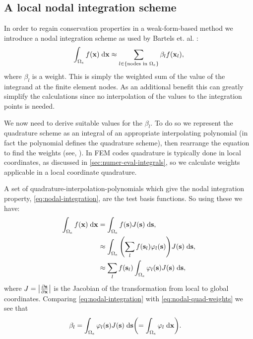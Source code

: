 {\subsection{A local nodal integration scheme}
\label{sec:local-nodal-integr}

In order to regain conservation properties in a weak-form-based method we introduce a nodal integration scheme as used by Bartels et. al. \cite{Bartels2006}:
\begin{equation}
  \label{eq:nodal-integration}
  \int_{\Omega_e} f(\boldsymbol{\mathrm{x}}) {\; \mathrm{{d}}} \boldsymbol{\mathrm{x}} \approx \sum_{l\in \left\{ {\text{nodes in $\Omega_e$}} \right\}} \beta_l f(\boldsymbol{\mathrm{x}}_l),
\end{equation}
where $\beta_l$ is a weight.
This is simply the weighted sum of the value of the integrand at the finite element nodes.
As an additional benefit this can greatly simplify the calculations since no interpolation of the values to the integration points is needed.

We now need to derive suitable values for the $\beta_l$.
To do so we represent the quadrature scheme as an integral of an appropriate interpolating polynomial (in fact the polynomial defines the quadrature scheme), then rearrange the equation to find the weights (see, \eg \cite[480]{Kincaid2002}).
In FEM codes quadrature is typically done in local coordinates, as discussed in \cref{sec:numer-eval-integrals}, so we calculate weights applicable in a local coordinate quadrature.

A set of quadrature-interpolation-polynomials which give the nodal integration property, \cref{eq:nodal-integration}, are the test basis functions.
So using these we have:
\begin{equation}
  \label{eq:nodal-quad-weights}
  \begin{aligned}
    \int_{\Omega_e} f(\boldsymbol{\mathrm{x}}) {\; \mathrm{{d}}} \boldsymbol{\mathrm{x}} &= \int_{\Omega_e} f({\boldsymbol{\mathrm{s}}}) J({\boldsymbol{\mathrm{s}}}) {\; \mathrm{{d}}} {\boldsymbol{\mathrm{s}}}, \\
    &\approx \int_{\Omega_e} {\left( \sum_l f({\boldsymbol{\mathrm{s}}}_l) \varphi_l({\boldsymbol{\mathrm{s}}}) \right)} J({\boldsymbol{\mathrm{s}}}) {\; \mathrm{{d}}} {\boldsymbol{\mathrm{s}}}, \\
    &\approx \sum_l f({\boldsymbol{\mathrm{s}}}_l) \int_{\Omega_e} \varphi_l({\boldsymbol{\mathrm{s}}}) J({\boldsymbol{\mathrm{s}}}) {\; \mathrm{{d}}} {\boldsymbol{\mathrm{s}}},
  \end{aligned}
\end{equation}
where $J = \left|{\frac{\partial {\boldsymbol{\mathrm{s}}}}{\partial \boldsymbol{\mathrm{x}}}} \right|$ is the Jacobian of the transformation from local to global coordinates.
Comparing \cref{eq:nodal-integration} with \cref{eq:nodal-quad-weights} we see that
\begin{equation}
  \begin{aligned}
    \beta_l &= \int_{\Omega_e} \varphi_l({\boldsymbol{\mathrm{s}}}) J({\boldsymbol{\mathrm{s}}}) {\; \mathrm{{d}}} {\boldsymbol{\mathrm{s}}} {\left( = \int_{\Omega_e} \varphi_l {\; \mathrm{{d}}}\boldsymbol{\mathrm{x}} \right)}.
  \end{aligned}
\end{equation}

}
